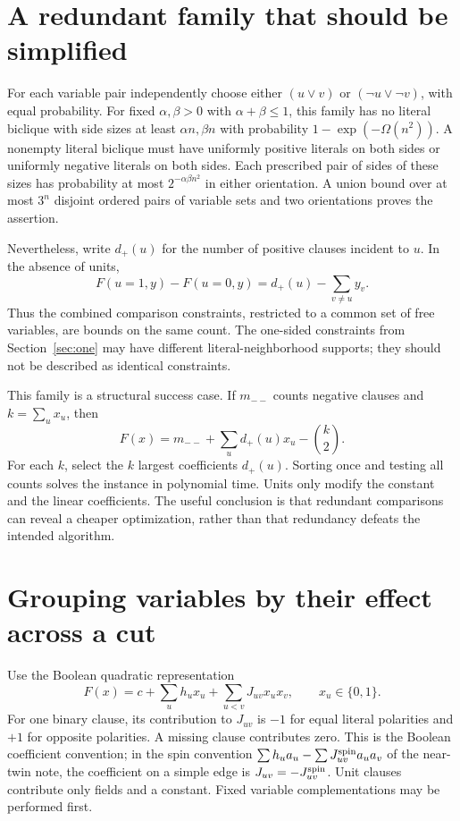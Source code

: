 \documentclass[11pt,a4paper]{article}
\theoremstyle{definition}
\begin{document}
\section{A redundant family that should be simplified}\label{sec:aligned}

For each variable pair independently choose either $(u\lor v)$ or
$(\neg u\lor\neg v)$, with equal probability. For fixed
$\alpha,\beta>0$ with $\alpha+\beta\le1$, this family has no literal
biclique with side sizes at least $\alpha n,\beta n$ with probability
$1-\exp(-\Omega(n^2))$. A nonempty literal biclique must have uniformly
positive literals on both sides or uniformly negative literals on both
sides. Each prescribed pair of sides of these sizes has probability at
most $2^{-\alpha\beta n^2}$ in either orientation. A union bound over
at most $3^n$ disjoint ordered pairs of variable sets and two orientations
proves the assertion.

Nevertheless, write $d_+(u)$ for the number of positive clauses incident
to $u$. In the absence of units,
\[
 F(u=1,y)-F(u=0,y)=d_+(u)-\sum_{v\ne u}y_v.
\]
Thus the combined comparison constraints, restricted to a common set of
free variables, are bounds on the same count. The one-sided constraints
from Section~\ref{sec:one} may have different literal-neighborhood
supports; they should not be described as identical constraints.

This family is a structural success case. If $m_{--}$ counts negative
clauses and $k=\sum_u x_u$, then
\begin{equation}
 F(x)=m_{--}+\sum_u d_+(u)x_u-\binom{k}{2}.
 \label{eq:sort}
\end{equation}
For each $k$, select the $k$ largest coefficients $d_+(u)$. Sorting once
and testing all counts solves the instance in polynomial time. Units only
modify the constant and the linear coefficients. The useful conclusion is
that redundant comparisons can reveal a cheaper optimization, rather than
that redundancy defeats the intended algorithm.

\section{Grouping variables by their effect across a cut}\label{sec:groups}

Use the Boolean quadratic representation
\begin{equation}
 F(x)=c+\sum_u h_u x_u+\sum_{u<v}J_{uv}x_ux_v,
 \qquad x_u\in\{0,1\}. \label{eq:quadratic}
\end{equation}
For one binary clause, its contribution to $J_{uv}$ is $-1$ for equal
literal polarities and $+1$ for opposite polarities. A missing clause
contributes zero. This is the Boolean coefficient convention; in the
spin convention $\sum h_u a_u-\sum J_{uv}^{\rm spin}a_ua_v$ of the
near-twin note, the coefficient on a simple edge is
$J_{uv}=-J_{uv}^{\rm spin}$. Unit clauses contribute only fields and a
constant. Fixed variable complementations may be performed first.
\end{document}
